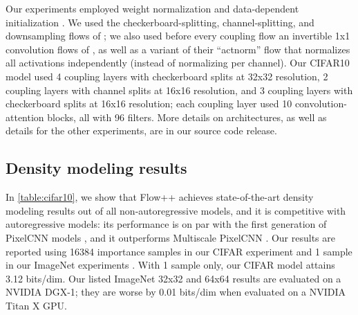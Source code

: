 \documentclass{article}
\begin{document}
Our experiments employed weight normalization and data-dependent initialization \citep{salimans2016weight}. We used the checkerboard-splitting, channel-splitting, and downsampling flows of \citet{dinh2016density}; we also used before every coupling flow an invertible 1x1 convolution flows of \citet{kingma2018glow}, as well as a variant of their ``actnorm'' flow that normalizes all activations independently (instead of normalizing per channel). Our CIFAR10 model used 4 coupling layers with checkerboard splits at 32x32 resolution, 2 coupling layers with channel splits at 16x16 resolution, and 3 coupling layers with checkerboard splits at 16x16 resolution; each coupling layer used 10 convolution-attention blocks, all with 96 filters. More details on architectures, as well as details for the other experiments, are in our source code release.


\subsection{Density modeling results}

In \cref{table:cifar10}, we show that Flow++ achieves state-of-the-art density modeling results out of all non-autoregressive models, and it is competitive with autoregressive models: its performance is on par with the first generation of PixelCNN models \citep{oord2016pixel}, and it outperforms Multiscale PixelCNN \citep{reed2017parallel}. Our results are reported using 16384 importance samples in our CIFAR experiment and 1 sample in our ImageNet experiments \citep{burda2015importance}. With 1 sample only, our CIFAR model attains 3.12 bits/dim.
Our listed ImageNet 32x32 and 64x64 results are evaluated on a NVIDIA DGX-1; they are worse by 0.01 bits/dim when evaluated on a NVIDIA Titan X GPU.
\end{document}
